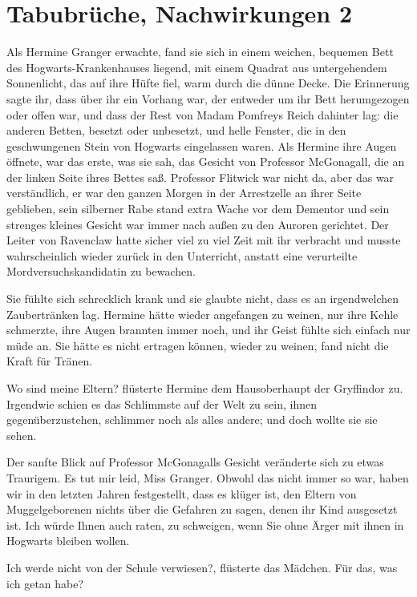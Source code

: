 \chapter{Tabubrüche, Nachwirkungen 2}

Als Hermine Granger erwachte, fand sie sich in einem weichen, bequemen Bett des
Hogwarts-Krankenhauses liegend, mit einem Quadrat aus untergehendem Sonnenlicht,
das auf ihre Hüfte fiel, warm durch die dünne Decke. Die Erinnerung sagte ihr,
dass über ihr ein Vorhang war, der entweder um ihr Bett herumgezogen oder offen
war, und dass der Rest von Madam Pomfreys Reich dahinter lag: die anderen
Betten, besetzt oder unbesetzt, und helle Fenster, die in den geschwungenen
Stein von Hogwarts eingelassen waren. Als Hermine ihre Augen öffnete, war das
erste, was sie sah, das Gesicht von Professor McGonagall, die an der linken
Seite ihres Bettes saß. Professor Flitwick war nicht da, aber das war
verständlich, er war den ganzen Morgen in der Arrestzelle an ihrer Seite
geblieben, sein silberner Rabe stand extra Wache vor dem Dementor und sein
strenges kleines Gesicht war immer nach außen zu den Auroren gerichtet. Der
Leiter von Ravenclaw hatte sicher viel zu viel Zeit mit ihr verbracht und musste
wahrscheinlich wieder zurück in den Unterricht, anstatt eine verurteilte
Mordversuchskandidatin zu bewachen.

Sie fühlte sich schrecklich krank und sie glaubte nicht, dass es an
irgendwelchen Zaubertränken lag. Hermine hätte wieder angefangen zu weinen, nur
ihre Kehle schmerzte, ihre Augen brannten immer noch, und ihr Geist fühlte sich
einfach nur müde an. Sie hätte es nicht ertragen können, wieder zu weinen, fand
nicht die Kraft für Tränen.

\glqq Wo sind meine Eltern?\grqq{} flüsterte Hermine dem Hausoberhaupt der
Gryffindor zu. Irgendwie schien es das Schlimmste auf der Welt zu sein, ihnen
gegenüberzustehen, schlimmer noch als alles andere; und doch wollte sie sie
sehen.

Der sanfte Blick auf Professor McGonagalls Gesicht veränderte sich zu etwas
Traurigem. \glqq Es tut mir leid, Miss Granger. Obwohl das nicht immer so war,
haben wir in den letzten Jahren festgestellt, dass es klüger ist, den Eltern von
Muggelgeborenen nichts über die Gefahren zu sagen, denen ihr Kind ausgesetzt
ist. Ich würde Ihnen auch raten, zu schweigen, wenn Sie ohne Ärger mit ihnen in
Hogwarts bleiben wollen.\grqq{}

\glqq Ich werde nicht von der Schule verwiesen?\grqq{}, flüsterte das Mädchen.
\glqq Für das, was ich getan habe?\grqq{}

